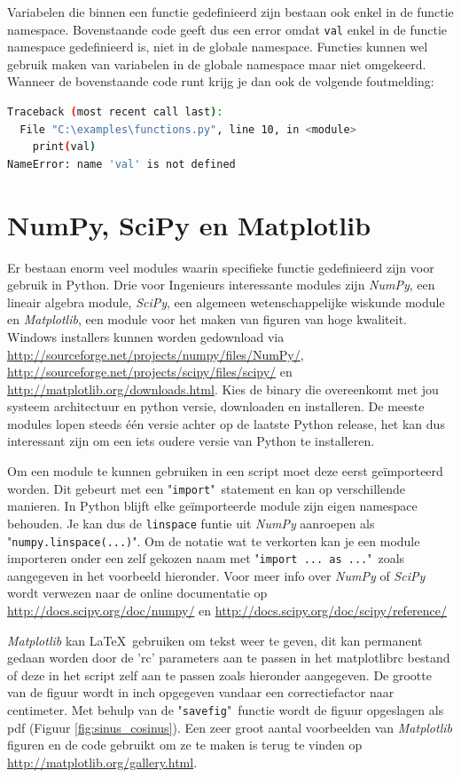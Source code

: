 \documentclass[11pt,twoside]{article}
\begin{document}
Variabelen die binnen een functie gedefinieerd zijn bestaan ook enkel in de functie namespace. Bovenstaande code geeft dus een error omdat \lstinline{val} enkel in de functie namespace gedefinieerd is, niet in de globale namespace. Functies kunnen wel gebruik maken van variabelen in de globale namespace maar niet omgekeerd. Wanneer de bovenstaande code runt krijg je dan ook de volgende foutmelding:
\begin{lstlisting}[language=bash]
Traceback (most recent call last):
  File "C:\examples\functions.py", line 10, in <module>
    print(val)
NameError: name 'val' is not defined
\end{lstlisting}

	\section{NumPy, SciPy en Matplotlib} 
Er bestaan enorm veel modules waarin specifieke functie gedefinieerd zijn voor gebruik in Python. Drie voor Ingenieurs interessante modules zijn \emph{NumPy}, een lineair algebra module, \emph{SciPy}, een algemeen wetenschappelijke wiskunde module en \emph{Matplotlib}, een module voor het maken van figuren van hoge kwaliteit. Windows installers kunnen worden gedownload via \url{http://sourceforge.net/projects/numpy/files/NumPy/}, \url{http://sourceforge.net/projects/scipy/files/scipy/} en \url{http://matplotlib.org/downloads.html}. Kies de binary die overeenkomt met jou systeem architectuur en python versie, downloaden en installeren. De meeste modules lopen steeds één versie achter op de laatste Python release, het kan dus interessant zijn om een iets oudere versie van Python te installeren.

Om een module te kunnen gebruiken in een script moet deze eerst geïmporteerd worden. Dit gebeurt met een "\lstinline{import}"\ statement en kan op verschillende manieren. In Python blijft elke geïmporteerde module zijn eigen namespace behouden. Je kan dus de \lstinline{linspace} funtie uit \emph{NumPy} aanroepen als "\lstinline{numpy.linspace(...)}". Om de notatie wat te verkorten kan je een module importeren onder een zelf gekozen naam met "\lstinline{import ... as ...}"\ zoals aangegeven in het voorbeeld hieronder. Voor meer info over \emph{NumPy} of \emph{SciPy} wordt verwezen naar de online documentatie op \url{http://docs.scipy.org/doc/numpy/} en \url{http://docs.scipy.org/doc/scipy/reference/}

\emph{Matplotlib} kan \LaTeX\ gebruiken om tekst weer te geven, dit kan permanent gedaan worden door de 'rc' parameters aan te passen in het \textsf{matplotlibrc} bestand of deze in het script zelf aan te passen zoals hieronder aangegeven. De grootte van de figuur wordt in inch opgegeven vandaar een correctiefactor naar centimeter. Met behulp van de "\lstinline{savefig}"\ functie wordt de figuur opgeslagen als pdf (Figuur \ref{fig:sinus_cosinus}). Een zeer groot aantal voorbeelden van \emph{Matplotlib} figuren en de code gebruikt om ze te maken is terug te vinden op \url{http://matplotlib.org/gallery.html}.

\end{document}
